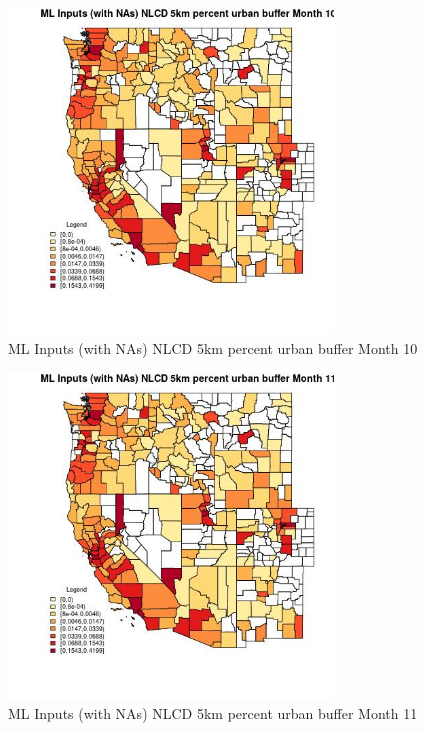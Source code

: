 \begin{figure} 
\centering  
\includegraphics[width=0.77\textwidth]{Code_Outputs/Report_ML_input_PM25_Step4_part_f_de_duplicated_aveswNAs_CountyNLCD_5km_percent_urban_buffermedianMonth10.jpg} 
\caption{\label{fig:Report_ML_input_PM25_Step4_part_f_de_duplicated_aveswNAsCountyNLCD_5km_percent_urban_buffermedianMonth10}ML Inputs (with NAs) NLCD 5km percent urban buffer Month 10} 
\end{figure} 
 

\begin{figure} 
\centering  
\includegraphics[width=0.77\textwidth]{Code_Outputs/Report_ML_input_PM25_Step4_part_f_de_duplicated_aveswNAs_CountyNLCD_5km_percent_urban_buffermedianMonth11.jpg} 
\caption{\label{fig:Report_ML_input_PM25_Step4_part_f_de_duplicated_aveswNAsCountyNLCD_5km_percent_urban_buffermedianMonth11}ML Inputs (with NAs) NLCD 5km percent urban buffer Month 11} 
\end{figure} 
 

